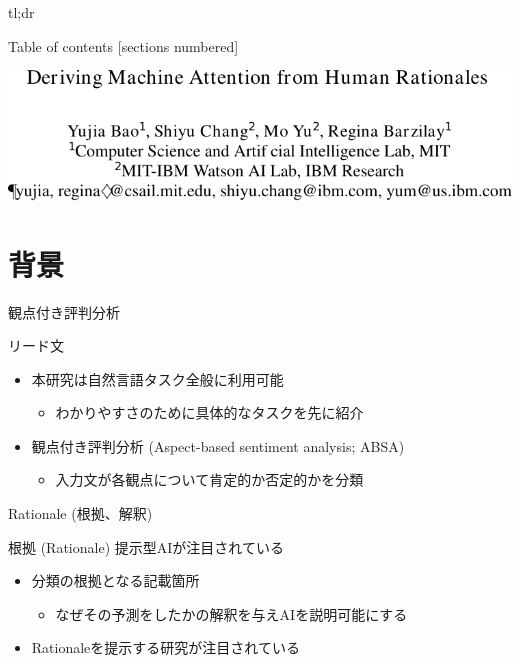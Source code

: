 \begin{frame}{tl;dr}
\end{frame}

\begin{frame}{Table of contents}
  [sections numbered]
  \tableofcontents[hideallsubsections]
\end{frame}

\begin{frame}[c]
  \begin{center}
    \includegraphics[width=\linewidth]{fig/title.pdf}    
  \end{center}
\end{frame}

\section{背景}
\frame[standout]{\insertsection}

\begin{frame}{観点付き評判分析}
\begin{lead}
    リード文
\end{lead}
\begin{itemize}
\item 本研究は自然言語タスク全般に利用可能
\begin{itemize}
    \item わかりやすさのために具体的なタスクを先に紹介
\end{itemize}
\item 観点付き評判分析 (Aspect-based sentiment analysis; ABSA)
\begin{itemize}
    \item 入力文が各観点について肯定的か否定的かを分類
\end{itemize}
\end{itemize}
\end{frame}

\begin{frame}{Rationale (根拠、解釈)}
\begin{lead}
    根拠 (Rationale) 提示型AIが注目されている
\end{lead}
\begin{itemize}
\item 分類の\alert{根拠}となる記載箇所
\begin{itemize}
    \item なぜその予測をしたかの\alert{解釈}を与えAIを\alert{説明可能}にする
\end{itemize}
\item Rationaleを提示する研究が注目されている\cite{lei_2016,ling_2017}
\end{itemize}
\end{frame}

